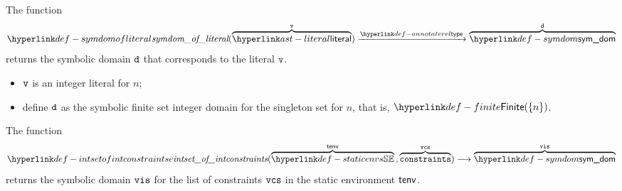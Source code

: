 \begin{mathpar}
\end{mathpar}

\hypertarget{def-symdomofliteral}{}
The function
\[
\symdomofliteral(\overname{\literal}{\vv}) \typearrow \overname{\symdom}{\vd}
\]
returns the symbolic domain $\vd$ that corresponds to the literal $\vv$.

\ProseParagraph
\AllApply
\begin{itemize}
  \item $\vv$ is an integer literal for $n$;
  \item define $\vd$ as the symbolic finite set integer domain for the singleton set for $n$, that is, $\Finite(\{n\})$.
\end{itemize}

\FormallyParagraph
\begin{mathpar}
\end{mathpar}

\hypertarget{def-intsetofintconstraintse}{}
The function
\[
  \intsetofintconstraints(
    \overname{\staticenvs}{\tenv} \aslsep
    \overname{\constraints}{\vcs}
  ) \aslto
  \overname{\symdom}{\vis}
\]
returns the symbolic domain $\vis$ for the list of constraints $\vcs$
in the static environment $\tenv$.


